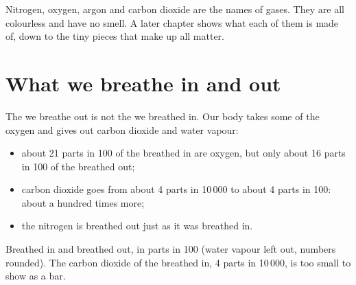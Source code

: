 \begin{remark}\label{rem:g4:air-a-mixture-of-gases:names}
Nitrogen, oxygen, argon and carbon dioxide are the names of gases. They
are all colourless and have no smell. A later chapter shows what each of
them is made of, down to the tiny pieces that make up all matter.
\end{remark}

\section{What we breathe in and out}

\begin{proposition}\label{prop:g4:air-a-mixture-of-gases:breath}
The  we breathe out is not the  we breathed in. Our body takes
some of the oxygen and gives out carbon dioxide and water vapour:
\begin{itemize}
  \item about 21 parts in 100 of the  breathed in are oxygen, but only
        about 16 parts in 100 of the  breathed out;
  \item carbon dioxide goes from about 4 parts in 10\,000 to about 4
        parts in 100: about a hundred times more;
  \item the nitrogen is breathed out just as it was breathed in.
\end{itemize}
\end{proposition}

\begin{omfigure}

{\small Breathed in and breathed out, in parts in 100 (water vapour left
out, numbers rounded). The carbon dioxide of the  breathed in, 4 parts
in 10\,000, is too small to show as a bar.}
\end{omfigure}

